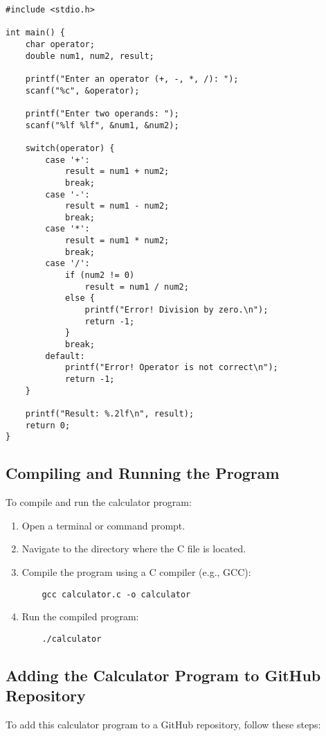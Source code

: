 \documentclass[a4paper,12pt]{article}
\begin{document}
\begin{verbatim}
#include <stdio.h>

int main() {
    char operator;
    double num1, num2, result;

    printf("Enter an operator (+, -, *, /): ");
    scanf("%c", &operator);

    printf("Enter two operands: ");
    scanf("%lf %lf", &num1, &num2);

    switch(operator) {
        case '+':
            result = num1 + num2;
            break;
        case '-':
            result = num1 - num2;
            break;
        case '*':
            result = num1 * num2;
            break;
        case '/':
            if (num2 != 0)
                result = num1 / num2;
            else {
                printf("Error! Division by zero.\n");
                return -1;
            }
            break;
        default:
            printf("Error! Operator is not correct\n");
            return -1;
    }

    printf("Result: %.2lf\n", result);
    return 0;
}
\end{verbatim}

\subsection{Compiling and Running the Program}
To compile and run the calculator program:
\begin{enumerate}
    \item Open a terminal or command prompt.
    \item Navigate to the directory where the C file is located.
    \item Compile the program using a C compiler (e.g., GCC):
    \begin{verbatim}
    gcc calculator.c -o calculator
    \end{verbatim}
    \item Run the compiled program:
    \begin{verbatim}
    ./calculator
    \end{verbatim}
\end{enumerate}

\subsection{Adding the Calculator Program to GitHub Repository}
To add this calculator program to a GitHub repository, follow these steps:
\end{document}
